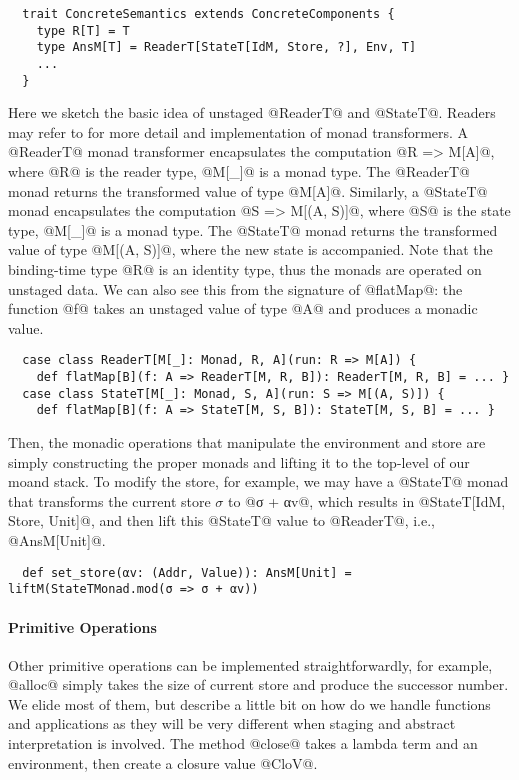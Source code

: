 \begin{lstlisting}
  trait ConcreteSemantics extends ConcreteComponents {
    type R[T] = T
    type AnsM[T] = ReaderT[StateT[IdM, Store, ?], Env, T]
    ...
  }
\end{lstlisting}

Here we sketch the basic idea of unstaged @ReaderT@ and @StateT@. Readers may
refer to  for more detail and implementation of monad
transformers.
A @ReaderT@ monad transformer encapsulates the computation @R => M[A]@, where
@R@ is the reader type, @M[_]@ is a monad type. The @ReaderT@ monad returns the
transformed value of type @M[A]@. Similarly, a @StateT@ monad encapsulates the
computation @S => M[(A, S)]@, where @S@ is the state type, @M[_]@ is a monad
type. The @StateT@ monad returns the transformed value of type @M[(A, S)]@,
where the new state is accompanied.
Note that the binding-time type @R@ is an identity type, thus the monads are
operated on unstaged data. We can also see this from the signature of @flatMap@:
the function @f@ takes an unstaged value of type @A@ and produces a monadic
value.

\begin{lstlisting}
  case class ReaderT[M[_]: Monad, R, A](run: R => M[A]) {
    def flatMap[B](f: A => ReaderT[M, R, B]): ReaderT[M, R, B] = ... }
  case class StateT[M[_]: Monad, S, A](run: S => M[(A, S)]) {
    def flatMap[B](f: A => StateT[M, S, B]): StateT[M, S, B] = ... }
\end{lstlisting}

Then, the monadic operations that manipulate the environment and store are
simply constructing the proper monads and lifting it to the top-level of our
moand stack. To modify the store, for example, we may have a @StateT@ monad that
transforms the current store $\sigma$ to @σ + αv@, which results in
@StateT[IdM, Store, Unit]@, and then lift this @StateT@ value to @ReaderT@,
i.e., @AnsM[Unit]@.
\begin{lstlisting}
  def set_store(αv: (Addr, Value)): AnsM[Unit] = liftM(StateTMonad.mod(σ => σ + αv))
\end{lstlisting}

\paragraph{Primitive Operations}
Other primitive operations can be implemented straightforwardly, for example,
@alloc@ simply takes the size of current store and produce the successor number.
We elide most of them, but describe a little bit on how do we handle functions
and applications as they will be very different when staging and abstract
interpretation is involved. The method @close@ takes a lambda term and an
environment, then create a closure value @CloV@.


